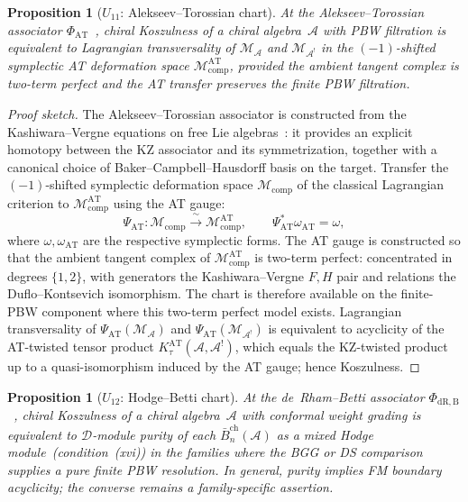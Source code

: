 \documentclass[11pt,reqno]{amsart}
\newtheorem{proposition}[theorem]{Proposition}
\theoremstyle{definition}
\theoremstyle{remark}
\newcommand{\cA}{\mathcal{A}}
\newcommand{\cD}{\mathcal{D}}
\newcommand{\cM}{\mathcal{M}}
\newcommand{\barBch}{\bar{B}^{\mathrm{ch}}}
\numberwithin{equation}{section}
\begin{document}
\begin{proposition}[$U_{11}$: Alekseev--Torossian chart]
\label{prop:at-chart}
At the Alekseev--Torossian associator
$\Phi_{\mathrm{AT}}$~\cite{AT12}, chiral Koszulness of a
chiral algebra~$\cA$ with PBW filtration is equivalent to
Lagrangian transversality of $\cM_\cA$ and $\cM_{\cA^!}$ in the
$(-1)$-shifted symplectic AT deformation space
$\cM^{\mathrm{AT}}_{\mathrm{comp}}$, provided the ambient tangent
complex is two-term perfect and the AT transfer preserves the
finite PBW filtration.
\end{proposition}

\begin{proof}[Proof sketch]
The Alekseev--Torossian associator is constructed from the
Kashiwara--Vergne equations on free Lie algebras~\cite{AT12}: it
provides an explicit homotopy between the KZ associator and its
symmetrization, together with a canonical choice of
Baker--Campbell--Hausdorff basis on the target.
Transfer the $(-1)$-shifted symplectic deformation space
$\cM_{\mathrm{comp}}$ of the classical Lagrangian criterion
to $\cM^{\mathrm{AT}}_{\mathrm{comp}}$ using the AT gauge:
\[
\Psi_{\mathrm{AT}} \colon
\cM_{\mathrm{comp}} \xrightarrow{\;\sim\;}
\cM^{\mathrm{AT}}_{\mathrm{comp}},
\qquad
\Psi_{\mathrm{AT}}^*\omega_{\mathrm{AT}} = \omega,
\]
where $\omega, \omega_{\mathrm{AT}}$ are the respective
symplectic forms. The AT gauge is constructed so that the ambient
tangent complex of $\cM^{\mathrm{AT}}_{\mathrm{comp}}$ is
two-term perfect: concentrated in degrees $\{1,2\}$, with
generators the Kashiwara--Vergne $F, H$ pair and relations the
Duflo--Kontsevich isomorphism. The chart is therefore available on
the finite-PBW component where this two-term perfect model exists.
Lagrangian transversality of $\Psi_{\mathrm{AT}}(\cM_\cA)$ and
$\Psi_{\mathrm{AT}}(\cM_{\cA^!})$ is equivalent to acyclicity of
the AT-twisted tensor product
$K_\tau^{\mathrm{AT}}(\cA, \cA^!)$, which equals the KZ-twisted
product up to a quasi-isomorphism induced by the AT gauge; hence
Koszulness.
\end{proof}

\begin{proposition}[$U_{12}$: Hodge--Betti chart]
\label{prop:hodge-betti-chart}
At the de~Rham--Betti associator
$\Phi_{\mathrm{dR,B}}$~\cite{Deligne89}, chiral Koszulness of a
chiral algebra~$\cA$ with conformal weight grading is equivalent
to $\cD$-module purity of each $\barBch_n(\cA)$ as a mixed Hodge
module~\textup{(}condition~\textup{(xvi)}\textup{)} in the
families where the BGG or DS comparison supplies a pure finite
PBW resolution. In general, purity implies FM boundary acyclicity;
the converse remains a family-specific assertion.
\end{proposition}
\end{document}

